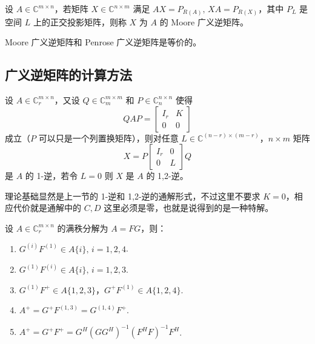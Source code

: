 \begin{definition}[广义逆的等价定义]
设 $A\in\mathbb C^{m\times n}$，若矩阵 $X\in\mathbb C^{n\times m}$ 满足 $AX=P_{R(A)},\,XA=P_{R(X)}$，其中 $P_L$ 是空间 $L$ 上的正交投影矩阵，则称 $X$ 为 $A$ 的 Moore 广义逆矩阵。
\end{definition}

\begin{theorem}
Moore 广义逆矩阵和 Penrose 广义逆矩阵是等价的。
\end{theorem}


\subsection{广义逆矩阵的计算方法}

\begin{theorem}
设 $A\in\mathbb C_r^{m\times n}$，又设 $Q\in\mathbb C_m^{m\times m}$ 和 $P\in\mathbb C_n^{n\times n}$ 使得
\[
    QAP=\begin{bmatrix}I_r&K\\0&0\end{bmatrix}
\]
成立（$P$ 可以只是一个列置换矩阵），则对任意 $L\in\mathbb C^{(n-r)\times (m-r)}$，$n\times m$ 矩阵
\[
    X=P\begin{bmatrix}I_r&0\\0&L\end{bmatrix}Q
\]
是 $A$ 的 1-逆，若令 $L=0$ 则 $X$ 是 $A$ 的 1,2-逆。
\end{theorem}

\begin{remark}
理论基础显然是上一节的 1-逆和 1,2-逆的通解形式，不过这里不要求 $K=0$，相应代价就是通解中的 $C,D$ 这里必须是零，也就是说得到的是一种特解。
\end{remark}

\begin{theorem}[满秩分解求广义逆矩阵]
设 $A\in\mathbb C_r^{m\times n}$ 的满秩分解为 $A=FG$，则：
\begin{enumerate}
    \item $G^{(i)}F^{(1)}\in A\{i\},\,i=1,2,4$.
    \item $G^{(1)}F^{(i)}\in A\{i\},\,i=1,2,3$.
    \item $G^{(1)}F^{+}\in A\{1,2,3\}$，$G^{+}F^{(1)}\in A\{1,2,4\}$.
    \item $A^+=G^+F^{(1,3)}=G^{(1,4)}F^+$.
    \item $A^+=G^+F^+=G^H(GG^H)^{-1}(F^HF)^{-1}F^H$.
\end{enumerate}
\end{theorem}

